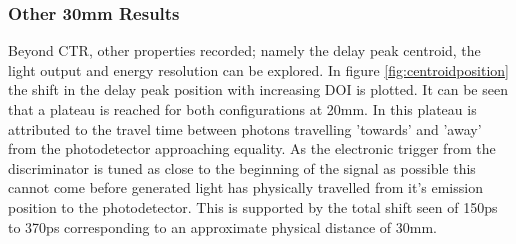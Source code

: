 \subsubsection{Other 30mm Results}
Beyond CTR, other properties recorded; namely the delay peak centroid, the light output and energy resolution can be explored. In figure \ref{fig:centroidposition} the shift in the delay peak position with increasing DOI is plotted. It can be seen that a plateau is reached for both configurations at 20mm. In \cite{Moses_Derenzo_1999} this plateau is attributed to the travel time between photons travelling 'towards' and 'away' from the photodetector approaching equality. As the electronic trigger from the discriminator is tuned as close to the beginning of the signal as possible this cannot come before generated light has physically travelled from it's emission position to the photodetector. This is supported by the total shift seen of 150ps to 370ps corresponding to an approximate physical distance of 30mm.
